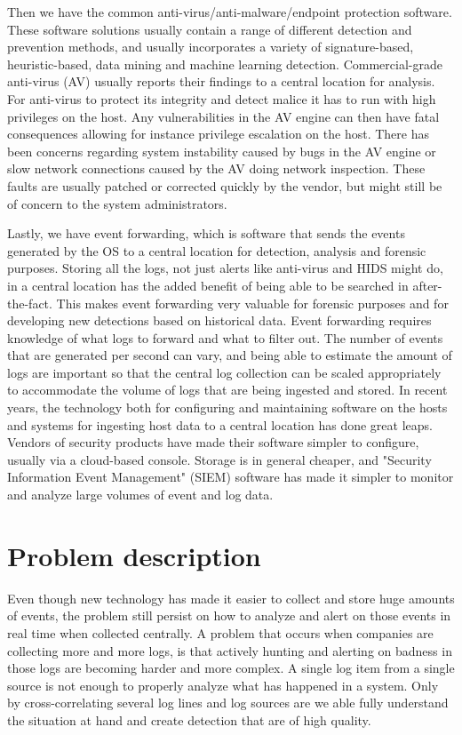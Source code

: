 Then we have the common anti-virus/anti-malware/endpoint protection software. These software solutions usually contain a range of different detection and prevention methods, and usually incorporates a variety of signature-based, heuristic-based, data mining and machine learning detection. Commercial-grade anti-virus (AV) usually reports their findings to a central location for analysis. For anti-virus to protect its integrity and detect malice it has to run with high privileges on the host. Any vulnerabilities in the AV engine can then have fatal consequences allowing for instance privilege escalation on the host. There has been concerns regarding system instability caused by bugs in the AV engine or slow network connections caused by the AV doing network inspection. These faults are usually patched or corrected quickly by the vendor, but might still be of concern to the system administrators.

Lastly, we have event forwarding, which is software that sends the events generated by the OS to a central location for detection, analysis and forensic purposes. Storing all the logs, not just alerts like anti-virus and HIDS might do, in a central location has the added benefit of being able to be searched in after-the-fact. This makes event forwarding very valuable for forensic purposes and for developing new detections based on historical data.
Event forwarding requires knowledge of what logs to forward and what to filter out. The number of events that are generated per second can vary, and being able to estimate the amount of logs are important so that the central log collection can be scaled appropriately to accommodate the volume of logs that are being ingested and stored.
In recent years, the technology both for configuring and maintaining software on the hosts and systems for ingesting host data to a central location has done great leaps. Vendors of security products have made their software simpler to configure, usually via a cloud-based console. Storage is in general cheaper, and "Security Information Event Management" (SIEM) software has made it simpler to monitor and analyze large volumes of event and log data.

\section{Problem description}
\label{sec:problemdescription}
Even though new technology has made it easier to collect and store huge amounts of events, the problem still persist on how to analyze and alert on those events in real time when collected centrally.
A problem that occurs when companies are collecting more and more logs, is that actively hunting and alerting on badness in those logs are becoming harder and more complex. A single log item from a single source is not enough to properly analyze what has happened in a system. Only by cross-correlating several log lines and log sources are we able fully understand the situation at hand and create detection that are of high quality.

